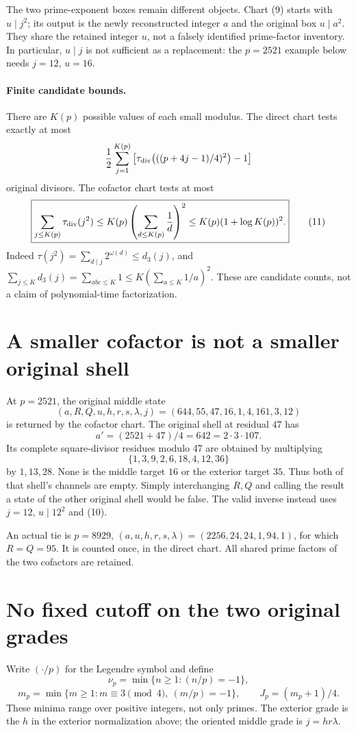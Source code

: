 The two prime-exponent boxes remain different objects. Chart (9) starts with
$u\mid j^2$; its output is the newly reconstructed integer $a$ and the original
box $u\mid a^2$. They share the retained integer $u$, not a falsely identified
prime-factor inventory. In particular, $u\mid j$ is not sufficient as a
replacement: the $p=2521$ example below needs $j=12$, $u=16$.

\paragraph{Finite candidate bounds.}
There are $K(p)$ possible values of each small modulus. The direct chart tests
exactly at most
\[
 \frac12\sum_{j=1}^{K(p)}
 \left[\tau_{\rm div}\!\left(((p+4j-1)/4)^2\right)-1\right]
\]
original divisors. The cofactor chart tests at most
\[
 \boxed{\sum_{j\le K(p)}\tau_{\rm div}(j^2)
 \le K(p)\left(\sum_{d\le K(p)}\frac1d\right)^2
 \le K(p)(1+\log K(p))^2.}                              \tag{11}
\]
Indeed $\tau(j^2)=\sum_{d\mid j}2^{\omega(d)}\le d_3(j)$, and
$\sum_{j\le K}d_3(j)=\sum_{abc\le K}1\le K(\sum_{a\le K}1/a)^2$.
These are candidate counts, not a claim of polynomial-time factorization.

\section{A smaller cofactor is not a smaller original shell}
At $p=2521$, the original middle state
\[
 (a,R,Q,u,h,r,s,\lambda,j)=(644,55,47,16,1,4,161,3,12)
\]
is returned by the cofactor chart. The original shell at residual $47$ has
\[
 a'=(2521+47)/4=642=2\cdot3\cdot107.
\]
Its complete square-divisor residues modulo 47 are obtained by multiplying
\[
 \{1,3,9,2,6,18,4,12,36\}
\]
by $1,13,28$. None is the middle target $16$ or the exterior target $35$.
Thus both of that shell's channels are empty. Simply interchanging $R,Q$ and
calling the result a state of the other original shell would be false.
The valid inverse instead uses $j=12$, $u\mid12^2$ and (10).

An actual tie is $p=8929$, $(a,u,h,r,s,\lambda)=(2256,24,24,1,94,1)$,
for which $R=Q=95$. It is counted once, in the direct chart. All shared
prime factors of the two cofactors are retained.

\section{No fixed cutoff on the two original grades}
Write $(\cdot/p)$ for the Legendre symbol and define
\[
 \nu_p=\min\{n\ge1:(n/p)=-1\},
\]
\[
 m_p=\min\{m\ge1:m\equiv3\pmod4,\ (m/p)=-1\},
 \qquad J_p=(m_p+1)/4.
\]
These minima range over positive integers, not only primes.  The exterior
grade is the $h$ in the exterior normalization above; the oriented middle
grade is $j=hr\lambda$.

